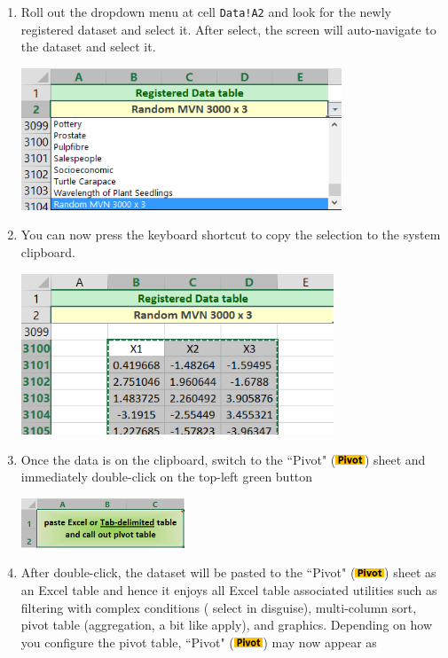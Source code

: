 \documentclass[article]{jss}
\newcommand{\shtPivot}{``Pivot" (\includegraphics[height=8pt, keepaspectratio=true]{PivotSheetTab_png}) }
\begin{document}
\begin{enumerate}
\begin{center}
        \end{center}
        \item Roll out the dropdown menu at cell \texttt{Data!A2} and look for the newly registered dataset and select it. After select, the screen will auto-navigate to the dataset and select it.
        \begin{center}
	        \includegraphics[height=120pt, keepaspectratio=true]{DataSheet_LocateDatasetViaMenu_png}
        \end{center}
        \item You can now press the keyboard shortcut to copy the selection to the system clipboard.
        \begin{center}
	        \includegraphics[height=136pt,keepaspectratio=true]{DataSheet_CopyDataset_png}
        \end{center}
        \item Once the data is on the clipboard, switch to the \shtPivot sheet and immediately double-click on the top-left green button
        \begin{center}
	        \includegraphics[height=42pt, keepaspectratio=true]{PivotPasteButton_png}
        \end{center}
        \item After double-click, the dataset will be pasted to the \shtPivot sheet as an Excel table and hence it enjoys all Excel table associated utilities such as filtering with complex conditions ( select in disguise), multi-column sort, pivot table (aggregation, a bit like  apply), and graphics. Depending on how you configure the pivot table, \shtPivot may now appear as

\end{enumerate}
\end{document}
